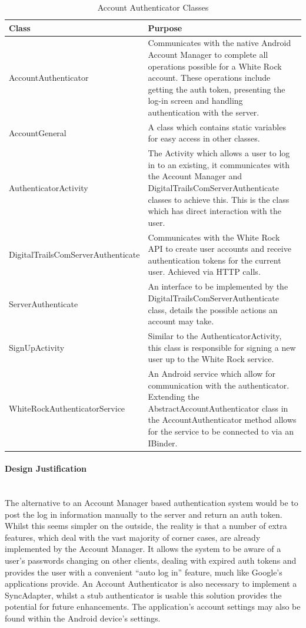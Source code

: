 \documentclass[11pt,a4paper]{report}
\begin{document}
\begin{longtable}{|p{7cm}|p{10cm}|}
\hline \caption{Account Authenticator Classes - Cont. on Next Page} \endfoot
\hline \caption{Account Authenticator Classes} \label{tab:accountauth} \endlastfoot
\hline
\textbf{Class} & \textbf{Purpose} \\ \hline
AccountAuthenticator & Communicates with the native Android Account Manager to complete all operations possible for a White Rock account. These operations include getting the auth token, presenting the log-in screen and handling authentication with the server. \\ \hline
AccountGeneral & A class which contains static variables for easy access in other classes. \\ \hline
AuthenticatorActivity & The Activity which allows a user to log in to an existing, it communicates with the Account Manager and DigitalTrailsComServerAuthenticate classes to achieve this. This is the class which has direct interaction with the user. \\ \hline
DigitalTrailsComServerAuthenticate & Communicates with the White Rock API to create user accounts and receive authentication tokens for the current user. Achieved via HTTP calls.  \\ \hline
ServerAuthenticate & An interface to be implemented by the DigitalTrailsComServerAuthenticate class, details the possible actions an account may take. \\ \hline
SignUpActivity & Similar to the AuthenticatorActivity, this class is responsible for signing a new user up to the White Rock service. \\ \hline
WhiteRockAuthenticatorService & An Android service which allow for communication with the authenticator. Extending the AbstractAccountAuthenticator class in the AccountAuthenticator method allows for the service to be connected to via an IBinder.  \\ \hline
\end{longtable}

\paragraph*{Design Justification}\mbox{}\\ 
The alternative to an Account Manager based authentication system would be to post the log in information manually to the server and return an auth token. Whilst this seems simpler on the outside, the reality is that a number of extra features, which deal with the vast majority of corner cases, are already implemented by the Account Manager. It allows the system to be aware of a user's passwords changing on other clients, dealing with expired auth tokens and provides the user with a convenient ``auto log in'' feature, much like Google's applications provide. An Account Authenticator is also necessary to implement a SyncAdapter, whilst a stub authenticator is usable this solution provides the potential for future enhancements. The application's account settings may also be found within the Android device's settings.
\end{document}

